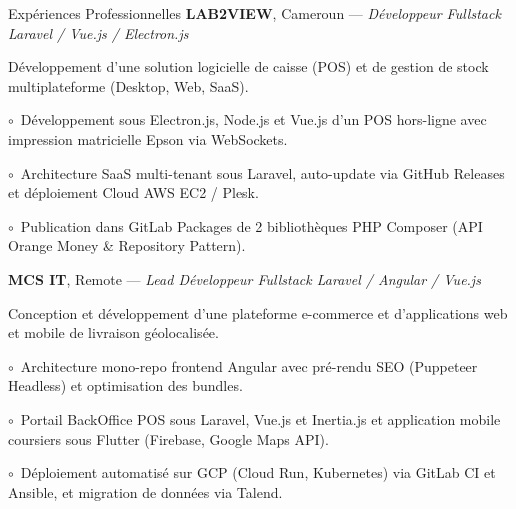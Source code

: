 \begin{rubric}{Expériences Professionnelles}
%
	\textbf{LAB2VIEW}, Cameroun --- \emph{Développeur Fullstack Laravel / Vue.js / Electron.js}\par
	Développement d'une solution logicielle de caisse (POS) et de gestion de stock multiplateforme (Desktop, Web, SaaS).
	\par\hspace{1em}$\circ$~Développement sous Electron.js, Node.js et Vue.js d'un POS hors-ligne avec impression matricielle Epson via WebSockets.
	\par\hspace{1em}$\circ$~Architecture SaaS multi-tenant sous Laravel, auto-update via GitHub Releases et déploiement Cloud AWS EC2 / Plesk.
	\par\hspace{1em}$\circ$~Publication dans GitLab Packages de 2 bibliothèques PHP Composer (API Orange Money \& Repository Pattern).

%
	\textbf{MCS IT}, Remote --- \emph{Lead Développeur Fullstack Laravel / Angular / Vue.js}\par
	Conception et développement d'une plateforme e-commerce et d'applications web et mobile de livraison géolocalisée.
	\par\hspace{1em}$\circ$~Architecture mono-repo frontend Angular avec pré-rendu SEO (Puppeteer Headless) et optimisation des bundles.
	\par\hspace{1em}$\circ$~Portail BackOffice POS sous Laravel, Vue.js et Inertia.js et application mobile coursiers sous Flutter (Firebase, Google Maps API).
	\par\hspace{1em}$\circ$~Déploiement automatisé sur GCP (Cloud Run, Kubernetes) via GitLab CI et Ansible, et migration de données via Talend.

\end{rubric}
